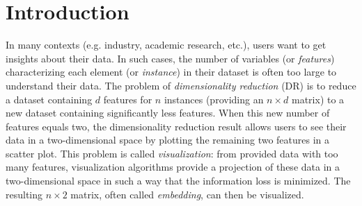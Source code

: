 \section{Introduction}


In many contexts (e.g. industry, academic research, etc.), users want to get insights about their data. In such cases, the number of variables (or \emph{features}) characterizing each element (or \emph{instance}) in their dataset is often too large to understand their data. The problem of {\it dimensionality reduction} (DR) is to reduce a dataset containing $d$ features for $n$ instances (providing an $n \times d$ matrix) to a new dataset containing significantly less features. When this new number of features equals two, the dimensionality reduction result allows users to see their data in a two-dimensional space by plotting the remaining two features in a scatter plot. This problem is called {\it visualization}: from provided data with too many features, visualization algorithms provide a projection of these data in a two-dimensional space in such a way that the information loss is minimized. The resulting $n \times 2$ matrix, often called {\it embedding}, can then be visualized.


